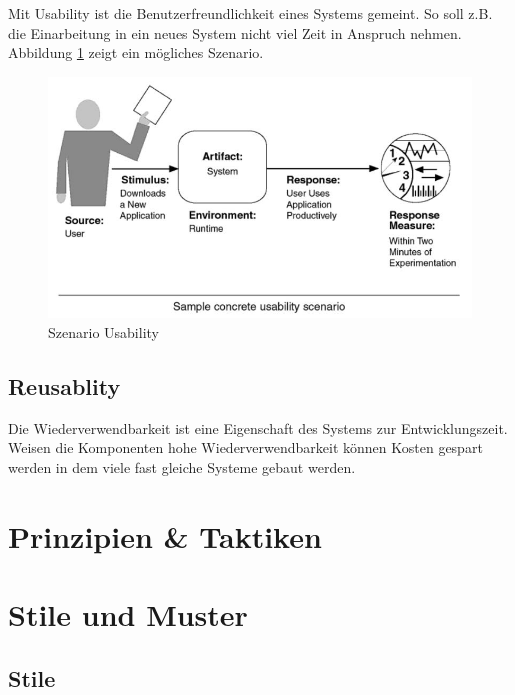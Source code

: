 Mit Usability ist die Benutzerfreundlichkeit eines Systems gemeint. So soll z.B. die Einarbeitung in ein neues System nicht viel Zeit in Anspruch nehmen. Abbildung \ref{fig:usability} zeigt ein mögliches Szenario.

\begin{figure}[h!]
\centering
\includegraphics[width=0.7\linewidth]{fig/usability}
\caption{Szenario Usability}
\label{fig:usability}
\end{figure}

\subsection{Reusablity}

Die Wiederverwendbarkeit ist eine Eigenschaft des Systems zur Entwicklungszeit. Weisen die Komponenten hohe Wiederverwendbarkeit können Kosten gespart werden in dem viele fast gleiche Systeme gebaut werden.

\section{Prinzipien \& Taktiken}

\section{Stile und Muster}

\subsection{Stile}

